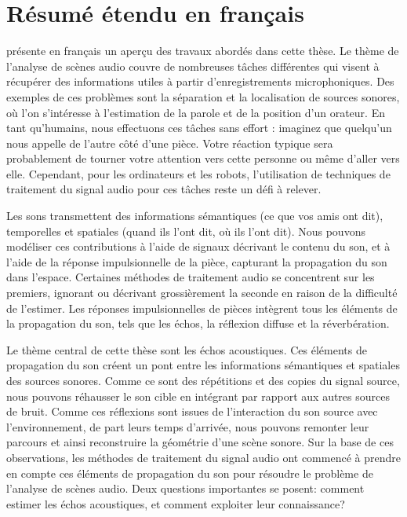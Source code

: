 \chapter*{Résumé étendu en français}

 présente en français un aperçu des travaux abordés dans cette thèse.
Le thème de l'analyse de scènes audio couvre de nombreuses tâches différentes qui visent à récupérer des informations utiles à partir d'enregistrements microphoniques.
Des exemples de ces problèmes sont la séparation et la localisation de sources sonores, où l'on s'intéresse à l'estimation de la parole et de la position d'un orateur.
En tant qu'humains, nous effectuons ces tâches sans effort : imaginez que quelqu'un nous appelle de l'autre côté d'une pièce.
Votre réaction typique sera probablement de tourner votre attention vers cette personne ou même d'aller vers elle.
Cependant, pour les ordinateurs et les robots, l'utilisation de techniques de traitement du signal audio pour ces tâches reste un défi à relever.

\mynewline
Les sons transmettent des informations sémantiques (ce que vos amis ont dit), temporelles et spatiales (quand ils l'ont dit, où ils l'ont dit).
Nous pouvons modéliser ces contributions à l'aide de signaux décrivant le contenu du son, et à l'aide de la réponse impulsionnelle de la pièce, capturant la propagation du son dans l'espace.
Certaines méthodes de traitement audio se concentrent sur les premiers, ignorant ou décrivant grossièrement la seconde en raison de la difficulté de l'estimer.
Les réponses impulsionnelles de pièces intègrent tous les éléments de la propagation du son, tels que les échos, la réflexion diffuse et la réverbération.

\mynewline
Le thème central de cette thèse sont les échos acoustiques.
Ces éléments de propagation du son créent un pont entre les informations sémantiques et spatiales des sources sonores.
Comme ce sont des répétitions et des copies du signal source, nous pouvons réhausser le son cible en intégrant par rapport aux autres sources de bruit.
Comme ces réflexions sont issues de l'interaction du son source avec l'environnement, de part leurs temps d'arrivée, nous pouvons remonter leur parcours et ainsi reconstruire la géométrie d'une scène sonore.
Sur la base de ces observations, les méthodes de traitement du signal audio ont commencé à prendre en compte ces éléments de propagation du son pour résoudre le problème de l'analyse de scènes audio.
Deux questions importantes se posent: comment estimer les échos acoustiques, et comment exploiter leur connaissance?

